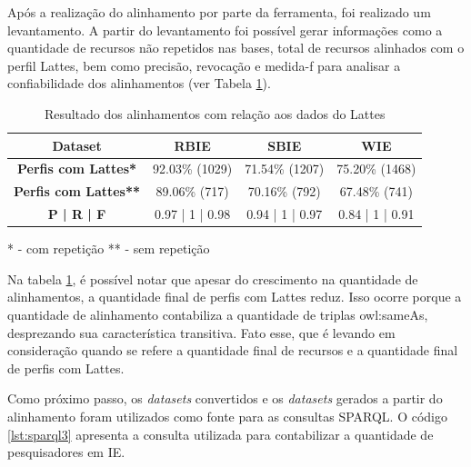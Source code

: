Após a realização do alinhamento por parte da ferramenta, foi realizado um levantamento. A partir do levantamento foi possível gerar informações como a quantidade de recursos não repetidos nas bases, total de recursos alinhados com o perfil Lattes, bem como precisão, revocação e medida-f \cite{goutte2005probabilistic} para analisar a confiabilidade dos alinhamentos (ver Tabela \ref{tab:case_study}).

\begin{table}[!ht]
\centering
\caption{ Resultado dos alinhamentos com relação aos dados do Lattes}
\label{tab:case_study}
\begin{tabular}{|c|c|c|c|}
\hline
\textbf{Dataset}	&	\textbf{RBIE}	&	\textbf{SBIE}	&	\textbf{WIE}  \\ \hline
\textbf{Perfis com Lattes*}	&	92.03\% (1029)	&	71.54\% (1207)	&	75.20\% (1468) \\ \hline
\textbf{Perfis com Lattes**}	&	89.06\% (717)	&	70.16\% (792)	&	67.48\% (741) \\ \hline
\textbf{P | R | F}	&	0.97 | 1 | 0.98	&	0.94 | 1 | 0.97 	&	0.84 | 1 | 0.91 \\ \hline
\end{tabular}
\end{table}
* - com repetição
** - sem repetição

Na tabela \ref{tab:case_study}, é possível notar que apesar do crescimento na quantidade de alinhamentos, a quantidade final de perfis com Lattes reduz. Isso ocorre porque a quantidade de alinhamento contabiliza a quantidade de triplas owl:sameAs, desprezando sua característica transitiva. Fato esse, que é levando em consideração quando se refere a quantidade final de recursos e a quantidade final de perfis com Lattes.

Como próximo passo, os \textit{datasets} convertidos e os \textit{datasets} gerados a partir do alinhamento foram utilizados como fonte para as consultas SPARQL. O código \ref{lst:sparql3} apresenta a consulta utilizada para contabilizar a quantidade de pesquisadores em IE. 

